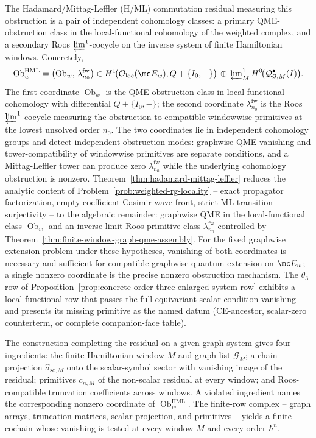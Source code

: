 The Hadamard/Mittag-Leffler (H/ML) commutation residual measuring this
obstruction is a pair of independent cohomology classes: a primary
QME-obstruction class in the local-functional cohomology of the
weighted complex, and a secondary Roos
\(\varprojlim^1\)-cocycle on the inverse system of finite Hamiltonian
windows.  Concretely,
\[
  \operatorname{Ob}^{\mathrm{HML}}_{w}
  =
  \bigl(
    \operatorname{Ob}_{w},\,
    \lambda^{\mathrm{fw}}_{n_0}
  \bigr)
  \in
  H^1\!\bigl(\mathcal O_{\mathrm{loc}}(\mc E_w),Q+\{I_0,-\}\bigr)
  \,\oplus\,
  \varprojlim\nolimits^1_M
  H^0\!\bigl(\mathcal Q^\bullet_{\mathcal G,M}(I)\bigr).
\]
The first coordinate \(\operatorname{Ob}_{w}\) is the QME obstruction
class in local-functional cohomology with differential \(Q+\{I_0,-\}\);
the second coordinate \(\lambda^{\mathrm{fw}}_{n_0}\) is the Roos
\(\varprojlim^1\)-cocycle measuring the obstruction to compatible
windowwise primitives at the lowest unsolved order \(n_0\).  The two
coordinates lie in independent cohomology groups and detect independent
obstruction modes: graphwise QME vanishing and tower-compatibility of windowwise
primitives are separate conditions, and a Mittag-Leffler tower can
produce zero \(\lambda^{\mathrm{fw}}_{n_0}\) while the underlying
cohomology obstruction is nonzero.
Theorem~\ref{thm:hadamard-mittag-leffler} reduces the analytic content
of Problem~\ref{prob:weighted-rg-locality} -- exact propagator
factorization, empty coefficient-Casimir wave front, strict ML
transition surjectivity -- to the algebraic remainder: graphwise QME
in the local-functional class \(\operatorname{Ob}_{w}\) and an
inverse-limit Roos primitive class \(\lambda^{\mathrm{fw}}_{n_0}\)
controlled by Theorem~\ref{thm:finite-window-graph-qme-assembly}.
For the fixed graphwise extension problem under these hypotheses,
vanishing of both coordinates is necessary and sufficient for
compatible graphwise quantum extension on \(\mc E_w\); a single nonzero
coordinate is the precise nonzero obstruction mechanism.  The \(\theta_3\) row
of Proposition~\ref{prop:concrete-order-three-enlarged-system-row}
exhibits a local-functional row that passes the full-equivariant
scalar-condition vanishing and presents its missing primitive as the
named datum (CE-ancestor, scalar-zero counterterm, or complete
companion-face table).

The construction completing the residual on a given graph system
gives four ingredients: the finite Hamiltonian window \(M\) and
graph list \(\mathcal G_M\); a chain projection
\(\widehat\sigma_{\mathrm{sc},M}\) onto the scalar-symbol sector with
vanishing image of the residual; primitives \(c_{n,M}\) of the
non-scalar residual at every window; and Roos-compatible truncation
coefficients across windows.  A violated ingredient names the corresponding
nonzero coordinate of
\(\operatorname{Ob}^{\mathrm{HML}}_{w}\).  The finite-row complex --
graph arrays, truncation matrices, scalar projection, and primitives --
yields a finite cochain whose vanishing
is tested at every window \(M\) and every order \(\hbar^n\).

